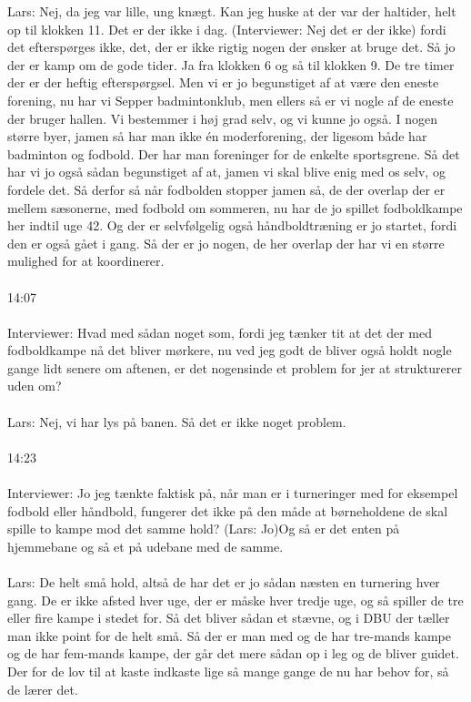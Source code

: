Lars: Nej, da jeg var lille, ung knægt. Kan jeg huske at der var der haltider, helt op til klokken 11. Det er der ikke i dag. (Interviewer: Nej det er der ikke) fordi det efterspørges ikke, det, der er ikke rigtig nogen der ønsker at bruge det. Så jo der er kamp om de gode tider. Ja fra klokken 6 og så til klokken 9. De tre timer der er der heftig efterspørgsel. Men vi er jo begunstiget af at være den eneste forening, nu har vi Sepper badmintonklub, men ellers så er vi nogle af de eneste der bruger hallen. Vi bestemmer i høj grad selv, og vi kunne jo også. I nogen større byer, jamen så har man ikke én moderforening, der ligesom både har badminton og fodbold. Der har man foreninger for de enkelte sportsgrene. Så det har vi jo også sådan begunstiget af at, jamen vi skal blive enig med os selv, og fordele det. Så derfor så når fodbolden stopper jamen så, de der overlap der er mellem sæsonerne, med fodbold om sommeren, nu har de jo spillet fodboldkampe her indtil uge 42. Og der er selvfølgelig også håndboldtræning er jo startet, fordi den er også gået i gang. Så der er jo nogen, de her overlap der har vi en større mulighed for at koordinerer.
\\\\
14:07\\\\
Interviewer: Hvad med sådan noget som, fordi jeg tænker tit at det der med fodboldkampe nå det bliver mørkere, nu ved jeg godt de bliver også holdt nogle gange lidt senere om aftenen, er det nogensinde et problem for jer at strukturerer uden om?
\\\\
Lars: Nej, vi har lys på banen. Så det er ikke noget problem.
\\\\
14:23\\\\
Interviewer: Jo jeg tænkte faktisk på, når man er i turneringer med for eksempel fodbold eller håndbold, fungerer det ikke på den måde at børneholdene de skal spille to kampe mod det samme hold? (Lars: Jo)Og så er det enten på hjemmebane og så et på udebane med de samme. 
\\\\
Lars: De helt små hold, altså de har det er jo sådan næsten en turnering hver gang. De er ikke afsted hver uge, der er måske hver tredje uge, og så spiller de tre eller fire kampe i stedet for. Så det bliver sådan et stævne, og i DBU der tæller man ikke point for de helt små. Så der er man med og de har tre-mands kampe og de har fem-mands kampe, der går det mere sådan op i leg og de bliver guidet. Der for de lov til at kaste indkaste lige så mange gange de nu har behov for, så de lærer det.
